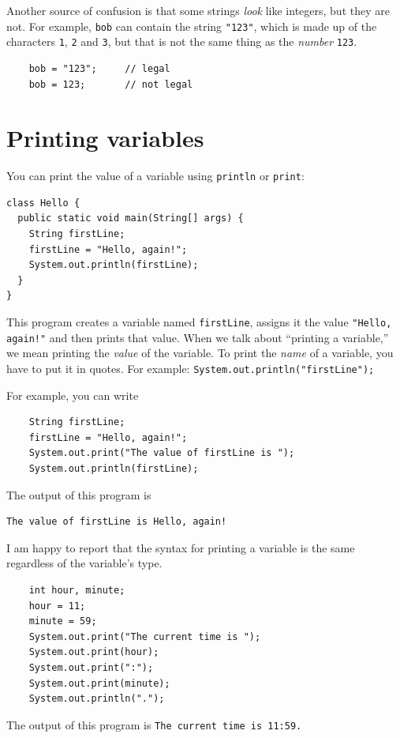 \documentclass[12pt]{book}
\theoremstyle{exercise}
\begin{document}
Another source of confusion is that some strings {\em look}
like integers, but they are not.  For example, {\tt bob}
can contain the string {\tt "123"}, which is made up of the
characters {\tt 1}, {\tt 2} and {\tt 3}, but that is not
the same thing as the {\em number} {\tt 123}.

\begin{lstlisting}
    bob = "123";     // legal
    bob = 123;       // not legal
\end{lstlisting}


\section{Printing variables}
\label{printing}

You can print the value of a variable using {\tt println} or
{\tt print}:

\begin{lstlisting}
class Hello {
  public static void main(String[] args) {
    String firstLine;
    firstLine = "Hello, again!";
    System.out.println(firstLine);
  }
}
\end{lstlisting}
%
This program creates a variable named {\tt firstLine}, assigns
it the value {\tt "Hello, again!"} and then prints that value.
When we talk about ``printing a variable,'' we mean printing
the {\em value} of the variable.  To print the {\em name} of
a variable, you have to put it in quotes.
For example: {\tt System.out.println("firstLine");}

For example, you can write

\begin{lstlisting}
    String firstLine;
    firstLine = "Hello, again!";
    System.out.print("The value of firstLine is ");
    System.out.println(firstLine);
\end{lstlisting}
%
The output of this program is

\begin{lstlisting}
The value of firstLine is Hello, again!
\end{lstlisting}
%
I am happy to report that the syntax for printing a variable
is the same regardless of the variable's type.

\begin{lstlisting}
    int hour, minute;
    hour = 11;
    minute = 59;
    System.out.print("The current time is ");
    System.out.print(hour);
    System.out.print(":");
    System.out.print(minute);
    System.out.println(".");
\end{lstlisting}
%
The output of this program is {\tt The current time is 11:59.}
\end{document}
